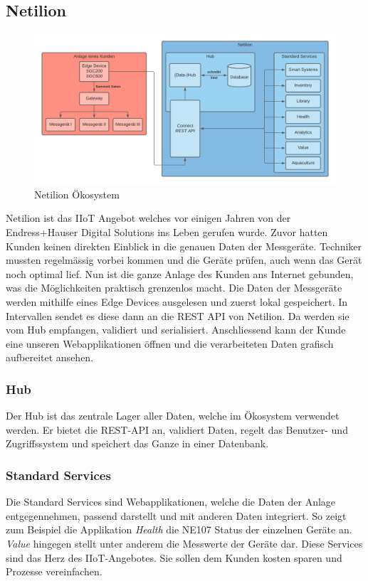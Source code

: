 \subsection{Netilion} \label{arch-netilion}
\begin{figure}[!ht]
  \centering
  \includegraphics[width=.95\linewidth]{./images/Netilion.png}
  \caption[{Diagram Netilion Ökosystem von Jonas Schultheiss}]{Netilion Ökosystem}
  \label{fig:netilion}
\end{figure}
Netilion ist das IIoT Angebot welches vor einigen Jahren von der Endress+Hauser Digital Solutions ins Leben gerufen wurde. Zuvor hatten Kunden keinen direkten Einblick in die genauen Daten der Messgeräte. Techniker mussten regelmässig vorbei kommen und die Geräte prüfen, auch wenn das Gerät noch optimal lief. Nun ist die ganze Anlage des Kunden ans Internet gebunden, was die Möglichkeiten praktisch grenzenlos macht.
\newline
Die Daten der Messgeräte werden mithilfe eines Edge Devices ausgelesen und zuerst lokal gespeichert. In Intervallen sendet es diese dann an die REST API von Netilion. Da werden sie vom Hub empfangen, validiert und serialisiert. Anschliessend kann der Kunde eine unseren Webapplikationen öffnen und die verarbeiteten Daten grafisch aufbereitet ansehen.
\subsubsection{Hub}
Der Hub ist das zentrale Lager aller Daten, welche im Ökosystem verwendet werden. Er bietet die REST-API an, validiert Daten, regelt das Benutzer- und Zugriffssystem und speichert das Ganze in einer Datenbank.
\subsubsection{Standard Services}
Die Standard Services sind Webapplikationen, welche die Daten der Anlage entgegennehmen, passend darstellt und mit anderen Daten integriert. So zeigt zum Beispiel die Applikation \textit{Health} die NE107 Status der einzelnen Geräte an. \textit{Value} hingegen stellt unter anderem die Messwerte der Geräte dar. Diese Services sind das Herz des IIoT-Angebotes. Sie sollen dem Kunden kosten sparen und Prozesse vereinfachen. 
